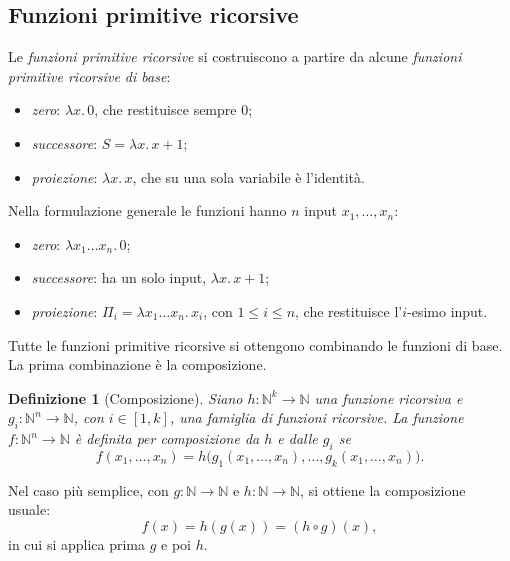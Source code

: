 \documentclass[a4paper, 11pt, oneside]{book}
\theoremstyle{formale}
\newtheorem*{definition}{Definizione}
\begin{document}
    \subsection{Funzioni primitive ricorsive}
    \label{sec:primitive-ricorsive}
    Le \emph{funzioni primitive ricorsive} si costruiscono a partire da alcune
    \emph{funzioni primitive ricorsive di base}:
    \begin{itemize}
        \item \emph{zero}: $\lambda x.\, 0$, che restituisce sempre $0$;
        \item \emph{successore}: $S = \lambda x.\, x + 1$;
        \item \emph{proiezione}: $\lambda x.\, x$, che su una sola variabile \`e
            l'identit\`a.
    \end{itemize}
    Nella formulazione generale le funzioni hanno $n$ input $x_1, \dots, x_n$:
    \begin{itemize}
        \item \emph{zero}: $\lambda x_1 \dots x_n.\, 0$;
        \item \emph{successore}: ha un solo input, $\lambda x.\, x + 1$;
        \item \emph{proiezione}: $\Pi_i = \lambda x_1 \dots x_n.\, x_i$, con
            $1 \leq i \leq n$, che restituisce l'$i$-esimo input.
    \end{itemize}

    Tutte le funzioni primitive ricorsive si ottengono combinando le funzioni di base.
    La prima combinazione \`e la composizione.

    \begin{definition}[Composizione]
        Siano $h \colon \mathbb{N}^k \to \mathbb{N}$ una funzione ricorsiva e
        $g_i \colon \mathbb{N}^n \to \mathbb{N}$, con $i \in [1, k]$, una famiglia di
        funzioni ricorsive. La funzione $f \colon \mathbb{N}^n \to \mathbb{N}$ \`e
        \emph{definita per composizione} da $h$ e dalle $g_i$ se
        \begin{equation*}
            f(x_1, \dots, x_n) = h\bigl(g_1(x_1, \dots, x_n), \dots,
            g_k(x_1, \dots, x_n)\bigr).
        \end{equation*}
    \end{definition}

    Nel caso pi\`u semplice, con $g \colon \mathbb{N} \to \mathbb{N}$ e
    $h \colon \mathbb{N} \to \mathbb{N}$, si ottiene la composizione usuale:
    \begin{equation*}
        f(x) = h(g(x)) = (h \circ g)(x),
    \end{equation*}
    in cui si applica prima $g$ e poi $h$.
\end{document}
